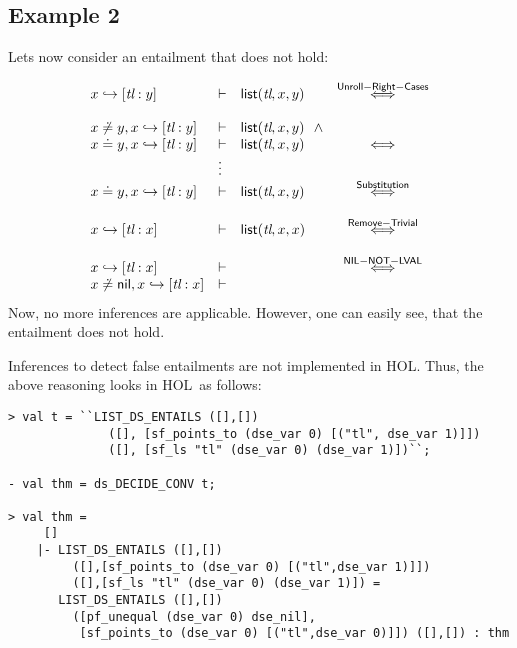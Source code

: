 \documentclass{scrartcl}
\theoremstyle{definition}
\newcommand{\HOL}{{\sf HOL}}
\newcommand{\nil}{{\textsf{nil}}}
\newcommand{\pfequal}[2]{\ensuremath{#1 \doteq #2}}
\newcommand{\pfunequal}[2]{\ensuremath{#1 \not\doteq #2}}
\newcommand{\sfpointsto}[2]{#1 \hookrightarrow [#2]}
\newcommand{\sflist}{{\textsf{list}}}
\begin{document}
\subsection{Example 2}

Lets now consider an entailment that does not hold:


\[\begin{array}{lllc}
\sfpointsto {x} {\textit{tl}:y} & \vdash & \sflist(\textit{tl},x,y) &
\stackrel{\sf Unroll-Right-Cases}{\Longleftrightarrow} \\
\\
\pfunequal {x} {y},\sfpointsto {x} {\textit{tl}:y} & \vdash &
  \sflist(\textit{tl},x,y)\ \ \wedge  \\
\pfequal x y,\sfpointsto {x} {\textit{tl}:y} & \vdash &
  \sflist(\textit{tl},x,y) & {\Longleftrightarrow}
\\ 
& \vdots \\
\pfequal x y,\sfpointsto {x} {\textit{tl}:y} & \vdash &
  \sflist(\textit{tl},x,y) & {\stackrel{\sf
    Substitution}{\Longleftrightarrow}} \\ \\
\sfpointsto {x} {\textit{tl}:x} & \vdash & \sflist(\textit{tl},x,x) & {\stackrel{\sf
    Remove-Trivial}{\Longleftrightarrow}} \\ \\
\sfpointsto {x} {\textit{tl}:x} & \vdash & & {\stackrel{\sf NIL-NOT-LVAL}{\Longleftrightarrow}}\\
\pfunequal x \nil, \sfpointsto {x} {\textit{tl}:x} & \vdash &
\end{array}
\]
%
Now, no more inferences are applicable. However, one can easily see, that the
entailment does not hold.

Inferences to detect false entailments are not implemented in \HOL. 
Thus, the above reasoning looks in \HOL\ as follows:
\begin{verbatim}
> val t = ``LIST_DS_ENTAILS ([],[])
              ([], [sf_points_to (dse_var 0) [("tl", dse_var 1)]])
              ([], [sf_ls "tl" (dse_var 0) (dse_var 1)])``;

- val thm = ds_DECIDE_CONV t;

> val thm =
     []
    |- LIST_DS_ENTAILS ([],[])
         ([],[sf_points_to (dse_var 0) [("tl",dse_var 1)]])
         ([],[sf_ls "tl" (dse_var 0) (dse_var 1)]) =
       LIST_DS_ENTAILS ([],[])
         ([pf_unequal (dse_var 0) dse_nil],
          [sf_points_to (dse_var 0) [("tl",dse_var 0)]]) ([],[]) : thm
\end{verbatim}
\end{document}
